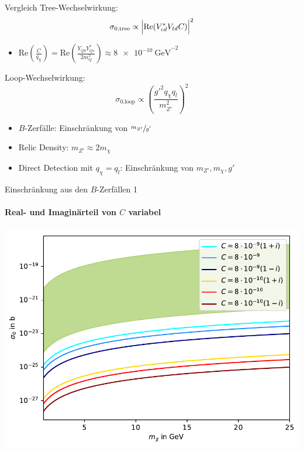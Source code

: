 \begin{frame}{Vergleich}
Tree-Wechselwirkung:
	\[ \sigma_\text{0,tree} \propto \Bigl|\text{Re}(V_{cd}^*V_{td}C)\Bigr|^2 \]
\begin{itemize}
	\item $\text{Re}\left(\frac{C}{q_\chi}\right) = \text{Re}\left(\frac{Y_{Qb}Y_{Qs}^*}{2m_Q^2}\right)\approx\SI{8e-10}{\giga\electronvolt}^{-2}$
\end{itemize}
Loop-Wechselwirkung:
	\[ \sigma_\text{0,loop} \propto \left(\frac{g'^2q_\chi q_l}{m_{Z'}^2}\right)^2 \]
\begin{itemize}
	\item $B$-Zerfälle: Einschränkung von $\sfrac{m_{Z'}}{g'}$
	\item Relic Density: $m_{Z'}\approx 2m_\chi$
	\item Direct Detection mit $q_\chi=q_l$: Einschränkung von $m_{Z'},m_\chi,g'$
\end{itemize}
\end{frame}


\begin{frame}{Einschränkung aus den $B$-Zerfällen 1}
\framesubtitle{Real- und Imaginärteil von $C$ variabel}
\includegraphics[width=\textwidth]{Bilder/Allgemein11.pdf}
\end{frame}


